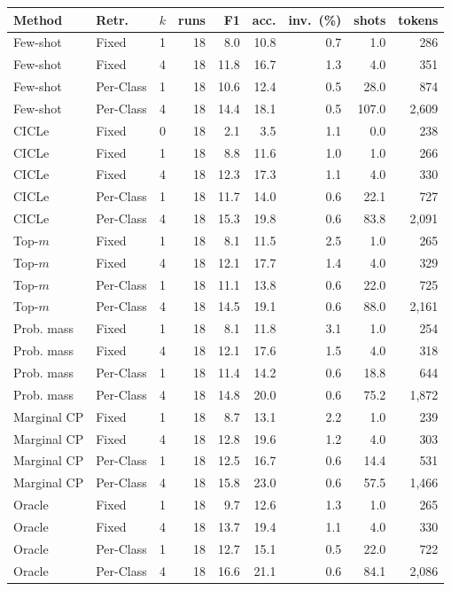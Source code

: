 \begin{tabular}{llrrrrrrr}
\toprule
Method & Retr. & $k$ & runs & F1 & acc. & inv.\ (\%) & shots & tokens \\
\midrule
Few-shot & Fixed & 1 & 18 & 8.0 & 10.8 & 0.7 & 1.0 & 286 \\
Few-shot & Fixed & 4 & 18 & 11.8 & 16.7 & 1.3 & 4.0 & 351 \\
Few-shot & Per-Class & 1 & 18 & 10.6 & 12.4 & 0.5 & 28.0 & 874 \\
Few-shot & Per-Class & 4 & 18 & 14.4 & 18.1 & 0.5 & 107.0 & 2,609 \\
CICLe & Fixed & 0 & 18 & 2.1 & 3.5 & 1.1 & 0.0 & 238 \\
CICLe & Fixed & 1 & 18 & 8.8 & 11.6 & 1.0 & 1.0 & 266 \\
CICLe & Fixed & 4 & 18 & 12.3 & 17.3 & 1.1 & 4.0 & 330 \\
CICLe & Per-Class & 1 & 18 & 11.7 & 14.0 & 0.6 & 22.1 & 727 \\
CICLe & Per-Class & 4 & 18 & 15.3 & 19.8 & 0.6 & 83.8 & 2,091 \\
\midrule
Top-$m$ & Fixed & 1 & 18 & 8.1 & 11.5 & 2.5 & 1.0 & 265 \\
Top-$m$ & Fixed & 4 & 18 & 12.1 & 17.7 & 1.4 & 4.0 & 329 \\
Top-$m$ & Per-Class & 1 & 18 & 11.1 & 13.8 & 0.6 & 22.0 & 725 \\
Top-$m$ & Per-Class & 4 & 18 & 14.5 & 19.1 & 0.6 & 88.0 & 2,161 \\
Prob. mass & Fixed & 1 & 18 & 8.1 & 11.8 & 3.1 & 1.0 & 254 \\
Prob. mass & Fixed & 4 & 18 & 12.1 & 17.6 & 1.5 & 4.0 & 318 \\
Prob. mass & Per-Class & 1 & 18 & 11.4 & 14.2 & 0.6 & 18.8 & 644 \\
Prob. mass & Per-Class & 4 & 18 & 14.8 & 20.0 & 0.6 & 75.2 & 1,872 \\
Marginal CP & Fixed & 1 & 18 & 8.7 & 13.1 & 2.2 & 1.0 & 239 \\
Marginal CP & Fixed & 4 & 18 & 12.8 & 19.6 & 1.2 & 4.0 & 303 \\
Marginal CP & Per-Class & 1 & 18 & 12.5 & 16.7 & 0.6 & 14.4 & 531 \\
Marginal CP & Per-Class & 4 & 18 & 15.8 & 23.0 & 0.6 & 57.5 & 1,466 \\
Oracle & Fixed & 1 & 18 & 9.7 & 12.6 & 1.3 & 1.0 & 265 \\
Oracle & Fixed & 4 & 18 & 13.7 & 19.4 & 1.1 & 4.0 & 330 \\
Oracle & Per-Class & 1 & 18 & 12.7 & 15.1 & 0.5 & 22.0 & 722 \\
Oracle & Per-Class & 4 & 18 & 16.6 & 21.1 & 0.6 & 84.1 & 2,086 \\
\bottomrule
\end{tabular}
